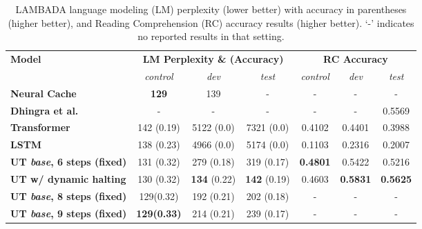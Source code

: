 \begin{table}[t!]
\centering
    \begin{adjustbox}{max width=\textwidth}
    \begin{tabular}{lcccccc}
    \toprule
    \multirow{2}{*}{ \bf Model } & \multicolumn{3}{c}{\bf LM Perplexity \& (Accuracy) } & \multicolumn{3}{c}{\bf RC Accuracy } \\ \cmidrule(l{2pt}r{2pt}){2-4} \cmidrule(l{2pt}r{2pt}){5-7}
    & \textit{control} & \textit{dev} & \textit{test} & \textit{control} & \textit{dev} & \textit{test} \\ \midrule
    \bf Neural Cache~\citep{grave2016improving} & {\bf 129} & 139 & - & - & - & - \\ 
    \bf Dhingra et al.~\cite{dhingra2018neural} & - & - & - & - & - & 0.5569 \\ \midrule
    \bf Transformer & 142 (0.19) & 5122 (0.0) & 7321 (0.0) & 
    0.4102 & 0.4401 & 0.3988 \\
    \bf LSTM & 138 (0.23) & 4966 (0.0) & 5174 (0.0) & 0.1103 & 0.2316 & 0.2007 \\
    \bf UT \emph{base}, 6 steps (fixed) & 131 (0.32) & 279 (0.18) & 319 (0.17) & {\bf 0.4801} & 0.5422 & 0.5216 \\
    \bf UT w/ dynamic halting & 130 (0.32) & {\bf 134} (0.22) & {\bf 142} (0.19) & 0.4603 & {\bf 0.5831} & {\bf 0.5625} \\ \midrule
    \bf UT \emph{base}, 8 steps (fixed) & 129(0.32) & 192 (0.21) & 202 (0.18) & - & - & - \\
    \bf UT \emph{base}, 9 steps (fixed) & \textbf{129(0.33)} & 214 (0.21) & 239 (0.17) & - & - & - \\
 \bottomrule
    \end{tabular}
    \end{adjustbox}
    \caption{LAMBADA language modeling (LM) perplexity (lower better) with accuracy in parentheses (higher better), and Reading Comprehension (RC) accuracy results (higher better). `-' indicates no reported results in that setting.}
    \label{tab:lambada}
\end{table}